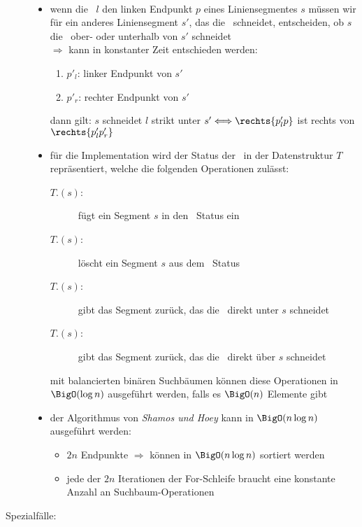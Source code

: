 \begin{description}
	\item[]\ \\\up\up
		\begin{itemize}
			\item wenn die \sweep~$l$ den linken Endpunkt $p$ eines Liniensegmentes $s$ müssen wir für ein anderes Liniensegment $s'$, das die \sweep~schneidet, entscheiden, ob $s$ die \sweep~ober- oder unterhalb von $s'$ schneidet\\
			$\Rightarrow$ kann in konstanter Zeit entschieden werden:
				\begin{enumerate}
					\item $p'_l$: linker Endpunkt von $s'$
					\item $p'_r$: rechter Endpunkt von $s'$
				\end{enumerate}
				dann gilt: $s$ schneidet $l$ strikt unter $s' \Longleftrightarrow \rechts{p'_lp}$ ist rechts von $\rechts{p'_lp'_r}$
			\item für die Implementation wird der Status der \sweep~in der Datenstruktur $T$ repräsentiert, welche die folgenden Operationen zulässt:
				\begin{description}
					\item[$T$.\insert$(s)$:] fügt ein Segment $s$ in den \sweep~Status ein
					\item[$T$.\delete$(s)$:] löscht ein Segment $s$ aus dem \sweep~Status
					\item[$T$.\pred$(s)$:] gibt das Segment zurück, das die \sweep~direkt unter $s$ schneidet
					\item[$T$.\succ$(s)$:] gibt das Segment zurück, das die \sweep~direkt über $s$ schneidet
				\end{description}
			mit balancierten binären Suchbäumen können diese Operationen in $\BigO(\log n)$ ausgeführt werden, falls es $\BigO(n)$ Elemente gibt
			\item der Algorithmus von \textit{Shamos und Hoey} kann in $\BigO(n\log n)$ ausgeführt werden:
				\begin{itemize}
					\item $2n$ Endpunkte $\Rightarrow$ können in $\BigO(n\log n)$ sortiert werden
					\item jede der $2n$ Iterationen der For-Schleife braucht eine konstante Anzahl an Suchbaum-Operationen
				\end{itemize}
		\end{itemize}
	\item[Spezialfälle:] \ \\\up

\end{description}
